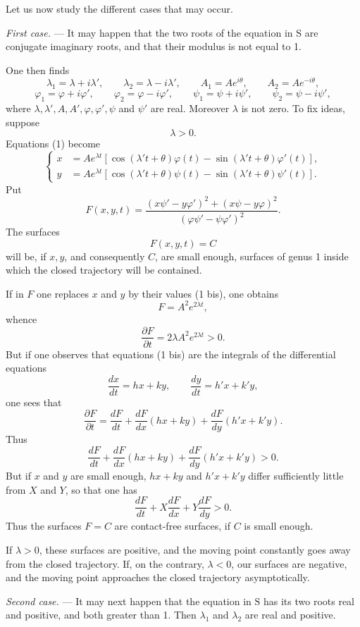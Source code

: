 \documentclass[11pt]{article}
\begin{document}
Let us now study the different cases that may occur.

\emph{First case.} — It may happen that the two roots of the equation in $\mathrm{S}$ are conjugate imaginary roots, and that their modulus is not equal to 1.

One then finds
\[
\lambda_1=\lambda+i\lambda',
\qquad
\lambda_2=\lambda-i\lambda',
\qquad
A_1=Ae^{i\theta},
\qquad
A_2=Ae^{-i\theta},
\]
\[
\varphi_1=\varphi+i\varphi',
\qquad
\varphi_2=\varphi-i\varphi',
\qquad
\psi_1=\psi+i\psi',
\qquad
\psi_2=\psi-i\psi',
\]
where $\lambda,\lambda',A,A',\varphi,\varphi',\psi$ and $\psi'$ are real. Moreover $\lambda$ is not zero. To fix ideas, suppose
\[
\lambda>0.
\]
Equations (1) become
\begin{equation}
\left\{
\begin{aligned}
x&=Ae^{\lambda t}\left[\cos(\lambda't+\theta)\varphi(t)-\sin(\lambda't+\theta)\varphi'(t)\right],\\
y&=Ae^{\lambda t}\left[\cos(\lambda't+\theta)\psi(t)-\sin(\lambda't+\theta)\psi'(t)\right].
\end{aligned}
\right.
\tag{1 bis}
\end{equation}
Put
\[
F(x,y,t)=\frac{(x\psi'-y\varphi')^2+(x\psi-y\varphi)^2}{(\varphi\psi'-\psi\varphi')^2}.
\]
The surfaces
\[
F(x,y,t)=C
\]
will be, if $x,y$, and consequently $C$, are small enough, surfaces of genus 1 inside which the closed trajectory will be contained.

If in $F$ one replaces $x$ and $y$ by their values (1 bis), one obtains
\[
F=A^2e^{2\lambda t},
\]
whence
\[
\frac{\partial F}{\partial t}=2\lambda A^2e^{2\lambda t}>0.
\]
But if one observes that equations (1 bis) are the integrals of the differential equations
\[
\frac{dx}{dt}=hx+ky,
\qquad
\frac{dy}{dt}=h'x+k'y,
\]
one sees that
\[
\frac{\partial F}{\partial t}=\frac{dF}{dt}+\frac{dF}{dx}(hx+ky)+\frac{dF}{dy}(h'x+k'y).
\]
Thus
\[
\frac{dF}{dt}+\frac{dF}{dx}(hx+ky)+\frac{dF}{dy}(h'x+k'y)>0.
\]
But if $x$ and $y$ are small enough, $hx+ky$ and $h'x+k'y$ differ sufficiently little from $X$ and $Y$, so that one has
\[
\frac{dF}{dt}+X\frac{dF}{dx}+Y\frac{dF}{dy}>0.
\]
Thus the surfaces $F=C$ are contact-free surfaces, if $C$ is small enough.

If $\lambda>0$, these surfaces are positive, and the moving point constantly goes away from the closed trajectory. If, on the contrary, $\lambda<0$, our surfaces are negative, and the moving point approaches the closed trajectory asymptotically.

\emph{Second case.} — It may next happen that the equation in $\mathrm{S}$ has its two roots real and positive, and both greater than 1. Then $\lambda_1$ and $\lambda_2$ are real and positive.
\end{document}
